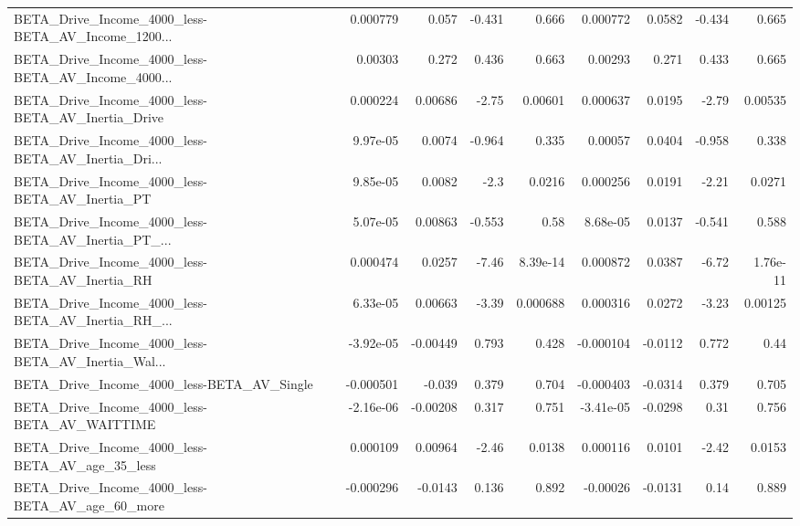 \begin{tabular}{lrrrrrrrr}
BETA\_Drive\_Income\_4000\_less-BETA\_AV\_Income\_1200... &    0.000779 &        0.057 &   -0.431 &    0.666 &   0.000772 &      0.0582 &       -0.434 &         0.665 \\
BETA\_Drive\_Income\_4000\_less-BETA\_AV\_Income\_4000... &     0.00303 &        0.272 &    0.436 &    0.663 &    0.00293 &       0.271 &        0.433 &         0.665 \\
BETA\_Drive\_Income\_4000\_less-BETA\_AV\_Inertia\_Drive  &    0.000224 &      0.00686 &    -2.75 &  0.00601 &   0.000637 &      0.0195 &        -2.79 &       0.00535 \\
BETA\_Drive\_Income\_4000\_less-BETA\_AV\_Inertia\_Dri... &    9.97e-05 &       0.0074 &   -0.964 &    0.335 &    0.00057 &      0.0404 &       -0.958 &         0.338 \\
BETA\_Drive\_Income\_4000\_less-BETA\_AV\_Inertia\_PT     &    9.85e-05 &       0.0082 &     -2.3 &   0.0216 &   0.000256 &      0.0191 &        -2.21 &        0.0271 \\
BETA\_Drive\_Income\_4000\_less-BETA\_AV\_Inertia\_PT\_... &    5.07e-05 &      0.00863 &   -0.553 &     0.58 &   8.68e-05 &      0.0137 &       -0.541 &         0.588 \\
BETA\_Drive\_Income\_4000\_less-BETA\_AV\_Inertia\_RH     &    0.000474 &       0.0257 &    -7.46 & 8.39e-14 &   0.000872 &      0.0387 &        -6.72 &      1.76e-11 \\
BETA\_Drive\_Income\_4000\_less-BETA\_AV\_Inertia\_RH\_... &    6.33e-05 &      0.00663 &    -3.39 & 0.000688 &   0.000316 &      0.0272 &        -3.23 &       0.00125 \\
BETA\_Drive\_Income\_4000\_less-BETA\_AV\_Inertia\_Wal... &   -3.92e-05 &     -0.00449 &    0.793 &    0.428 &  -0.000104 &     -0.0112 &        0.772 &          0.44 \\
BETA\_Drive\_Income\_4000\_less-BETA\_AV\_Single         &   -0.000501 &       -0.039 &    0.379 &    0.704 &  -0.000403 &     -0.0314 &        0.379 &         0.705 \\
BETA\_Drive\_Income\_4000\_less-BETA\_AV\_WAITTIME       &   -2.16e-06 &     -0.00208 &    0.317 &    0.751 &  -3.41e-05 &     -0.0298 &         0.31 &         0.756 \\
BETA\_Drive\_Income\_4000\_less-BETA\_AV\_age\_35\_less    &    0.000109 &      0.00964 &    -2.46 &   0.0138 &   0.000116 &      0.0101 &        -2.42 &        0.0153 \\
BETA\_Drive\_Income\_4000\_less-BETA\_AV\_age\_60\_more    &   -0.000296 &      -0.0143 &    0.136 &    0.892 &   -0.00026 &     -0.0131 &         0.14 &         0.889 \\

\end{tabular}
